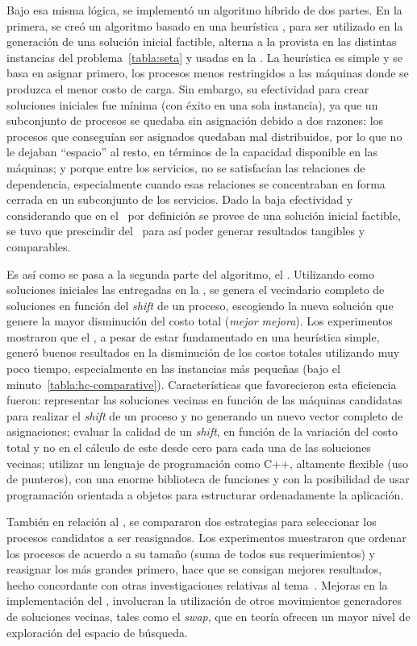 \documentclass[../informe2.tex]{subfiles}
\begin{document}
\noindent Bajo esa misma lógica, se implementó un algoritmo híbrido de dos partes. En la primera, se creó un algoritmo basado en una heurística \greedy, para ser utilizado en la generación de una solución inicial factible, alterna a la provista en las distintas instancias del problema~\ref{tabla:seta} y usadas en la \roadef. La heurística es simple y se basa en asignar primero, los procesos menos restringidos a las máquinas donde se produzca el menor costo de carga. Sin embargo, su efectividad para crear soluciones iniciales fue mínima (con éxito en una sola instancia), ya que un subconjunto de procesos se quedaba sin asignación debido a dos razones: los procesos que conseguían ser asignados quedaban mal distribuidos, por lo que no le dejaban ``espacio'' al resto, en términos de la capacidad disponible en las máquinas; y porque entre los servicios, no se satisfacían las relaciones de dependencia, especialmente cuando esas relaciones se concentraban en forma cerrada en un subconjunto de los servicios. Dado la baja efectividad y considerando que en el \mrp\ por definición se provee de una solución inicial factible, se tuvo que prescindir del \greedy\ para así poder generar resultados tangibles y comparables. \par
\noindent Es así como se pasa a la segunda parte del algoritmo, el \hillc. Utilizando como soluciones iniciales las entregadas en la \roadef, se genera el vecindario completo de soluciones en función del \textit{shift} de un proceso, escogiendo la nueva solución que genere la mayor disminución del costo total (\textit{mejor mejora}). Los experimentos mostraron que el \hillc, a pesar de estar fundamentado en una heurística simple, generó buenos resultados en la disminución de los costos totales utilizando muy poco tiempo, especialmente en las instancias más pequeñas (bajo el minuto~\ref{tabla:hc-comparative}). Características que favorecieron esta eficiencia fueron: representar las soluciones vecinas en función de las máquinas candidatas para realizar el \textit{shift} de un proceso y no generando un nuevo vector completo de asignaciones; evaluar la calidad de un \textit{shift}, en función de la variación del costo total y no en el cálculo de este desde cero para cada una de las soluciones vecinas; utilizar un lenguaje de programación como C++, altamente flexible (uso de punteros), con una enorme biblioteca de funciones y con la posibilidad de usar programación orientada a objetos para estructurar ordenadamente la aplicación. \par
\noindent También en relación al \hillc, se compararon dos estrategias para seleccionar los procesos candidatos a ser reasignados. Los experimentos muestraron que ordenar los procesos de acuerdo a su tamaño (suma de todos sus requerimientos) y reasignar los más grandes primero, hace que se consigan mejores resultados, hecho concordante con otras investigaciones relativas al tema~\cite{gavranovicefficient}. Mejoras en la implementación del \hillc, involucran la utilización de otros movimientos generadores de soluciones vecinas, tales como el \textit{swap}, que en teoría ofrecen un mayor nivel de exploración del espacio de búsqueda. \par
\end{document}
